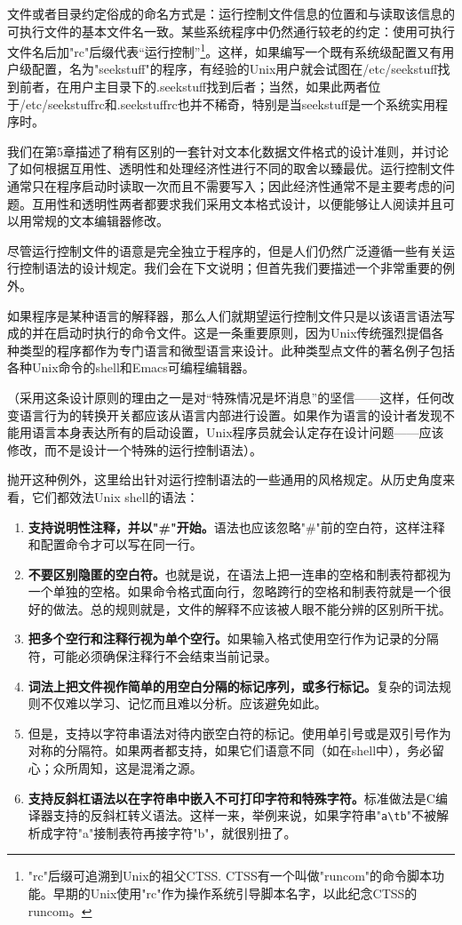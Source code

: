 \documentclass[12pt,oneside]{book}
\begin{document}
文件或者目录约定俗成的命名方式是：运行控制文件信息的位置和与读取该信息的可执行文件的基本文件名一致。某些系统程序中仍然通行较老的约定：使用可执行文件名后加"rc"后缀代表“运行控制”\footnote{"rc"后缀可追溯到Unix的祖父CTSS. CTSS有一个叫做"runcom"的命令脚本功能。早期的Unix使用"rc"作为操作系统引导脚本名字，以此纪念CTSS的runcom。}。这样，如果编写一个既有系统级配置又有用户级配置，名为"seekstuff"的程序，有经验的Unix用户就会试图在/etc/seekstuff找到前者，在用户主目录下的.seekstuff找到后者；当然，如果此两者位于/etc/seekstuffrc和.seekstuffrc也并不稀奇，特别是当seekstuff是一个系统实用程序时。

我们在第5章描述了稍有区别的一套针对文本化数据文件格式的设计准则，并讨论了如何根据互用性、透明性和处理经济性进行不同的取舍以臻最优。运行控制文件通常只在程序启动时读取一次而且不需要写入；因此经济性通常不是主要考虑的问题。互用性和透明性两者都要求我们采用文本格式设计，以便能够让人阅读并且可以用常规的文本编辑器修改。

尽管运行控制文件的语意是完全独立于程序的，但是人们仍然广泛遵循一些有关运行控制语法的设计规定。我们会在下文说明；但首先我们要描述一个非常重要的例外。

如果程序是某种语言的解释器，那么人们就期望运行控制文件只是以该语言语法写成的并在启动时执行的命令文件。这是一条重要原则，因为Unix传统强烈提倡各种类型的程序都作为专门语言和微型语言来设计。此种类型点文件的著名例子包括各种Unix命令的shell和Emacs可编程编辑器。

（采用这条设计原则的理由之一是对“特殊情况是坏消息”的坚信——这样，任何改变语言行为的转换开关都应该从语言内部进行设置。如果作为语言的设计者发现不能用语言本身表达所有的启动设置，Unix程序员就会认定存在设计问题——应该修改，而不是设计一个特殊的运行控制语法）。

抛开这种例外，这里给出针对运行控制语法的一些通用的风格规定。从历史角度来看，它们都效法Unix shell的语法：
\begin{enumerate}
\item \textbf{支持说明性注释，并以"\#{}"开始。}语法也应该忽略"\#{}"前的空白符，这样注释和配置命令才可以写在同一行。
\item \textbf{不要区别隐匿的空白符。}也就是说，在语法上把一连串的空格和制表符都视为一个单独的空格。如果命令格式面向行，忽略跨行的空格和制表符就是一个很好的做法。总的规则就是，文件的解释不应该被人眼不能分辨的区别所干扰。
\item \textbf{把多个空行和注释行视为单个空行。}如果输入格式使用空行作为记录的分隔符，可能必须确保注释行不会结束当前记录。
\item \textbf{词法上把文件视作简单的用空白分隔的标记序列，或多行标记。}复杂的词法规则不仅难以学习、记忆而且难以分析。应该避免如此。
\item 但是，支持以字符串语法对待内嵌空白符的标记。使用单引号或是双引号作为对称的分隔符。如果两者都支持，如果它们语意不同（如在shell中），务必留心；众所周知，这是混淆之源。
\item \textbf{支持反斜杠语法以在字符串中嵌入不可打印字符和特殊字符。}标准做法是C编译器支持的反斜杠转义语法。这样一来，举例来说，如果字符串"\verb+a\tb+"不被解析成字符"a"接制表符再接字符"b"，就很别扭了。
\end{enumerate}
\end{document}
